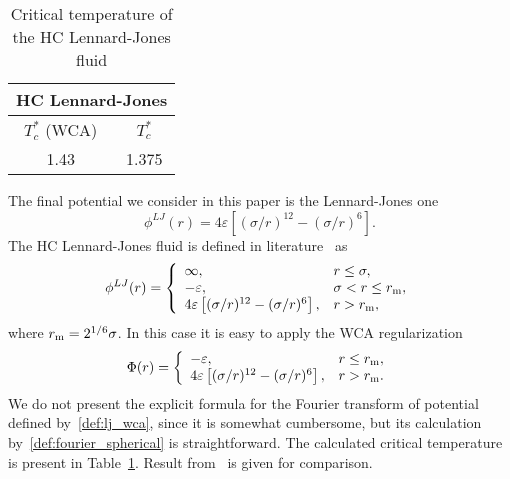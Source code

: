 \begin{table}[h]
	\noindent\caption{Critical temperature of the HC Lennard-Jones fluid}\vskip3mm
	\begin{tabular}{|c|c|}
		\hline
		\multicolumn{2}{|c|}{HC Lennard-Jones}\\
		\hline
		$T_c^*$ (WCA) & $T_c^*$ \cite{SowersStanley1991} \\
		\hline
		1.43 & 1.375 \\
		\hline
	\end{tabular}
	\label{tab:lj_temp_cr}
\end{table}

The final potential we consider in this paper is the Lennard-Jones one
\begin{equation*}
	\phi^{LJ}(r) = 4\varepsilon \left[(\sigma/r)^{12} - (\sigma/r)^6\right].
\end{equation*}
The HC Lennard-Jones fluid is defined in literature~\cite{SowersStanley1991,DiezLargoSolana2010} as
\begin{equation*}
	\phi^{LJ}(r) = \left\{
	\begin{array}{llll}
		\infty, & r\leq \sigma,
		\\
		-\varepsilon, & \sigma < r \leq r_{\rm m}, 
		\\
		4\varepsilon \left[(\sigma/r)^{12} - (\sigma/r)^6\right], & r > r_{\rm m},
	\end{array}
	\right.
\end{equation*}
where $r_{\rm m}=2^{1/6}\sigma$.
In this case it is easy to apply the WCA regularization
\begin{equation}
	\label{def:lj_wca}
	\Phi(r) = \left\{
	\begin{array}{ll}
		-\varepsilon, & r \leq r_{\rm m},
		\\
		4\varepsilon \left[(\sigma/r)^{12} - (\sigma/r)^6\right], & r > r_{\rm m}.
	\end{array}	
	\right.
\end{equation}
We do not present the explicit formula for the Fourier transform of potential defined by~\eqref{def:lj_wca}, since it is somewhat cumbersome, but its calculation by~\eqref{def:fourier_spherical} is straightforward. 
The calculated critical temperature is present in Table~\ref{tab:lj_temp_cr}. Result from~\cite{SowersStanley1991} is given for comparison.

